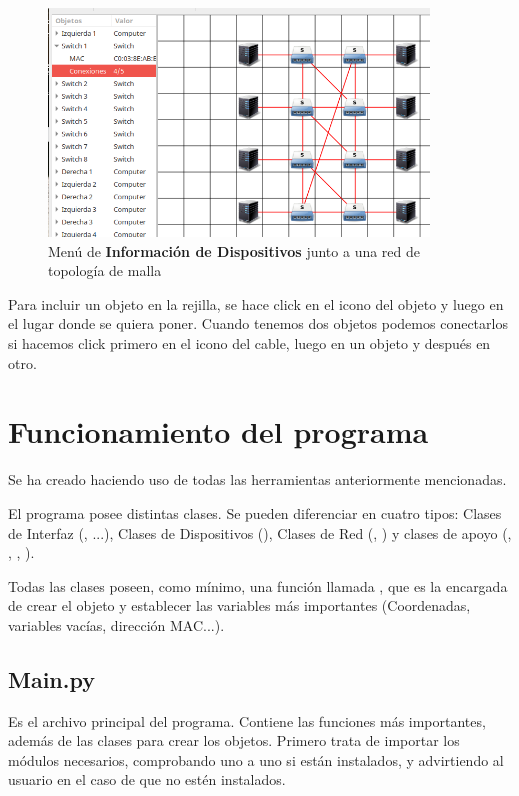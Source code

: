 \documentclass[a4paper, 11pt]{report} %
\begin{document}
\begin{figure}[H]
\centering
\includegraphics[width=0.9\textwidth]{Resources/Screenshots/2016-09-07-140130_728x437_scrot.png}
\caption[Menú de Información de Dispositivos]{Menú de \textbf{Información de Dispositivos} junto a una red de topología de malla \label{dispinfo}}
\end{figure}
Para incluir un objeto en la rejilla, se hace click en el icono del objeto y luego  en el lugar donde se quiera poner. Cuando tenemos dos objetos podemos conectarlos si hacemos click primero en el icono del cable, luego en un objeto y después en otro.

\section{Funcionamiento del programa}
Se ha creado haciendo uso de todas las herramientas anteriormente mencionadas.

El programa posee distintas clases. Se pueden diferenciar en cuatro tipos: Clases de Interfaz (, ...), 
Clases de Dispositivos (), Clases de Red (, ) y clases de apoyo (, , , ).

Todas las clases poseen, como mínimo, una función llamada , que es la encargada de crear el objeto y establecer las variables más importantes (Coordenadas, variables vacías, dirección MAC...).

\subsection{Main.py}
Es el archivo principal del programa. Contiene las funciones más importantes, además de las clases para crear los objetos. Primero trata de importar los módulos necesarios, comprobando uno a uno si están instalados, y advirtiendo al usuario en el caso de que no estén instalados.
\end{document}
